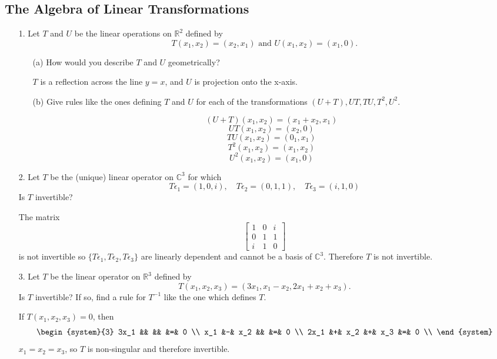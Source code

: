 \documentclass{article}
\begin{document}
\subsection{The Algebra of Linear Transformations}
\begin{enumerate}[listparindent=\parindent]
\item[1.] Let \(T\) and \(U\) be the linear operations on \(\mathbb{R}^2\) defined by
    \[ T(x_1, x_2) = (x_2, x_1) \text{ and } U(x_1, x_2) = (x_1, 0). \]

    \begin{enumerate}[listparindent=\parindent]
        \item[(a)] How would you describe \(T\) and \(U\) geometrically?

            \(T\) is a reflection across the line \(y = x\), and \(U\) is projection onto the x-axis.

        \item[(b)] Give rules like the ones defining \(T\) and \(U\) for each of the transformations
            \((U + T), UT, TU, T^2, U^2\).

            \[(U + T)(x_1, x_2) = (x_1 + x_2, x_1)\]
            \[UT(x_1, x_2) = (x_2, 0)\]
            \[TU(x_1, x_2) = (0_1, x_1)\]
            \[T^2(x_1, x_2) = (x_1, x_2)\]
            \[U^2(x_1, x_2) = (x_1, 0)\]
    \end{enumerate}

\item[2.] Let \(T\) be the (unique) linear operator on \(\mathbb{C}^3\) for which
    \[ T\epsilon_1 = (1, 0, i),\quad T\epsilon_2 = (0, 1, 1),\quad T\epsilon_3 = (i, 1, 0)\]
    Is \(T\) invertible?

    The matrix
    \[
        \begin{bmatrix}
            1 & 0 & i \\
            0 & 1 & 1 \\
            i & 1 & 0
        \end{bmatrix}
    \]
    is not invertible so \(\{T\epsilon_1, T\epsilon_2, T\epsilon_3\}\) are linearly dependent and cannot be a basis of \(\mathbb{C}^3\).
    Therefore \(T\) is not invertible.

\item[3.] Let \(T\) be the linear operator on \(\mathbb{R}^3\) defined by
    \[T(x_1, x_2, x_3) = (3x_1, x_1 - x_2, 2x_1 + x_2 + x_3).\]
    Is \(T\) invertible? If so, find a rule for \(T^{-1}\) like the one which defines \(T\).

    If \(T(x_1, x_2, x_3) = 0\), then
    \[
        \begin{system}{3}
            3x_1 && && &=& 0 \\
            x_1 &-& x_2 && &=& 0 \\
            2x_1 &+& x_2 &+& x_3 &=& 0 \\
        \end{system}
    \]
    \(x_1 = x_2 = x_3\), so \(T\) is non-singular and therefore invertible.


\end{enumerate}
\end{document}
